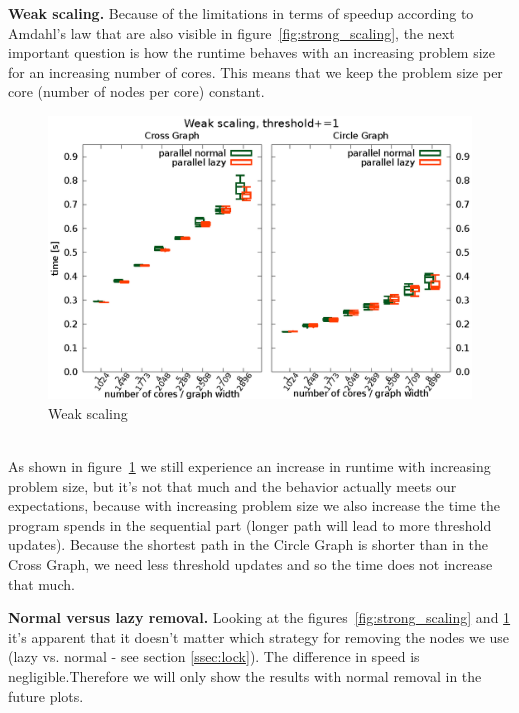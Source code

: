 \documentclass[letterpaper]{article}
\newcommand{\mypar}[1]{{\bf #1.}}
\begin{document}
\mypar{Weak scaling}
Because of the limitations in terms of speedup according to Amdahl's law that are also visible in figure~\ref{fig:strong_scaling}, the next important question is how the runtime behaves with an increasing problem size for an increasing number of cores. This means that we keep the problem size per core (number of nodes per core) constant.
\begin{figure}[h]\centering
  \includegraphics[scale=0.558]{weak_scaling.eps}
  \caption{Weak scaling\label{fig:weak_scaling}}
\end{figure}\\
As shown in figure~\ref{fig:weak_scaling} we still experience an increase in runtime with increasing problem size, but it's not that much and the behavior actually meets our expectations, because with increasing problem size we also increase the time the program spends in the sequential part (longer path will lead to more threshold updates). Because the shortest path in the Circle Graph is shorter than in the Cross Graph, we need less threshold updates and so the time does not increase that much.

\mypar{Normal versus lazy removal} Looking at the figures~\ref{fig:strong_scaling} and \ref{fig:weak_scaling} it's apparent that it doesn't matter which strategy for removing the nodes we use (lazy vs. normal - see section \ref{ssec:lock}). The difference in speed is negligible.Therefore we will only show the results with normal removal in the future plots.
\end{document}
